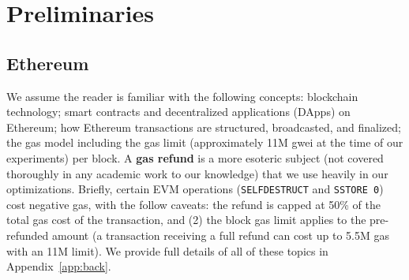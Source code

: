 


\section{Preliminaries}

\subsection{Ethereum}

We assume the reader is familiar with the following concepts: blockchain technology; smart contracts and decentralized applications (DApps) on Ethereum; how Ethereum transactions are structured, broadcasted, and finalized; the gas model including the gas limit (approximately 11M gwei at the time of our experiments) per block. A \textbf{gas refund} is a more esoteric subject (not covered thoroughly in any academic work to our knowledge) that we use heavily in our optimizations. Briefly, certain EVM operations (\texttt{SELFDESTRUCT} and \texttt{SSTORE 0}) cost negative gas, with the follow caveats: the refund is capped at 50\% of the total gas cost of the transaction, and (2) the block gas limit applies to the pre-refunded amount (\ie a transaction receiving a full refund can cost up to 5.5M gas with an 11M limit). We provide full details of all of these topics in Appendix~\ref{app:back}. 

